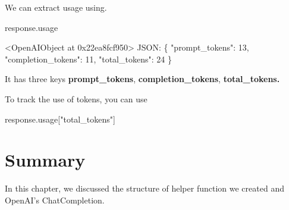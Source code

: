 \documentclass[
  letterpaper,
  DIV=11,
  numbers=noendperiod]{scrreprt}
\newenvironment{Shaded}{\begin{snugshade}}{\end{snugshade}}
\newcommand{\BaseNTok}[1]{\textcolor[rgb]{0.68,0.00,0.00}{#1}}
\newcommand{\DecValTok}[1]{\textcolor[rgb]{0.68,0.00,0.00}{#1}}
\newcommand{\NormalTok}[1]{\textcolor[rgb]{0.00,0.23,0.31}{#1}}
\newcommand{\OperatorTok}[1]{\textcolor[rgb]{0.37,0.37,0.37}{#1}}
\newcommand{\StringTok}[1]{\textcolor[rgb]{0.13,0.47,0.30}{#1}}
\begin{document}
We can extract usage using.

\begin{Shaded}
\begin{Highlighting}[]
\NormalTok{response.usage}
\end{Highlighting}
\end{Shaded}

\begin{Shaded}
\begin{Highlighting}[]
\OperatorTok{\textless{}}\NormalTok{OpenAIObject at }\BaseNTok{0x22ea8fcf950}\OperatorTok{\textgreater{}}\NormalTok{ JSON: \{}
  \StringTok{"prompt\_tokens"}\NormalTok{: }\DecValTok{13}\NormalTok{,}
  \StringTok{"completion\_tokens"}\NormalTok{: }\DecValTok{11}\NormalTok{,}
  \StringTok{"total\_tokens"}\NormalTok{: }\DecValTok{24}
\NormalTok{\}}
\end{Highlighting}
\end{Shaded}

It has three keys \textbf{prompt\_tokens}, \textbf{completion\_tokens},
\textbf{total\_tokens.}

To track the use of tokens, you can use

\begin{Shaded}
\begin{Highlighting}[]
\NormalTok{response.usage[}\StringTok{"total\_tokens"}\NormalTok{]}
\end{Highlighting}
\end{Shaded}

\hypertarget{summary-1}{%
\section{Summary}\label{summary-1}}

In this chapter, we discussed the structure of helper function we
created and OpenAI's ChatCompletion.
\end{document}
